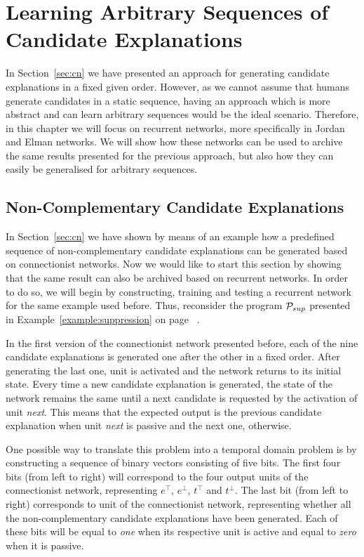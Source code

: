 
\chapter{Learning Arbitrary Sequences of Candidate Explanations}
\label{sec:nn}

In Section~\ref{sec:cn} we have presented an approach for generating candidate explanations in a fixed given order. However, as we cannot assume that humans generate candidates in a static sequence, having an approach which is more abstract and can learn arbitrary sequences would be the ideal scenario. Therefore, in this chapter we will focus on recurrent networks, more specifically in Jordan and Elman networks. We will show how these networks can be used to archive the same results presented for the previous approach, but also how they can easily be generalised for arbitrary sequences.

\section{Non-Complementary Candidate Explanations}
\label{sec:nn:ncce}

In Section~\ref{sec:cn} we have shown by means of an example how a predefined sequence of non-complementary candidate explanations can be generated based on connectionist networks. Now we would like to start this section by showing that the same result can also be archived based on recurrent networks. In order to do so, we will begin by constructing, training and testing a recurrent network for the same example used before. Thus, reconsider the program $\mathcal{P}_{sup}$ presented in Example~\ref{example:suppression} on page ~\pageref{example:suppression}.

In the first version of the connectionist network presented before, each of the nine candidate explanations is generated one after the other in a fixed order. After generating the last one, unit \Done is activated and the network returns to its initial state. Every time a new candidate explanation is generated, the state of the network remains the same until a next candidate is requested by the activation of unit \textit{next}. This means that the expected output is the previous candidate explanation when unit \textit{next} is passive and the next one, otherwise.

One possible way to translate this problem into a temporal domain problem is by constructing a sequence of binary vectors consisting of five bits. The first four bits (from left to right) will correspond to the four output units of the connectionist network, representing $e^\top$, $e^\bot$, $t^\top$ and $t^\bot$. The last bit (from left to right) corresponds to unit \Done of the connectionist network, representing whether all the non-complementary candidate explanations have been generated. Each of these bits will be equal to \textit{one} when its respective unit is active and equal to \textit{zero} when it is passive.

